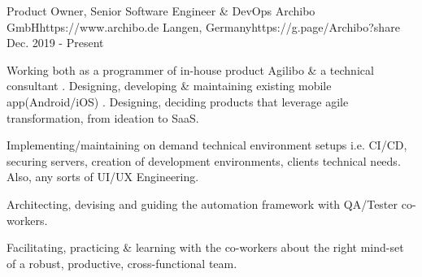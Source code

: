 

\begin{workentries}

\workentry
{Product Owner, Senior Software Engineer \& DevOps} %
{Archibo GmbH}{https://www.archibo.de} %
{Langen, Germany}{https://g.page/Archibo?share} %
{Dec. 2019 - Present} %
    {
      \begin{workitems} %
        \item {Working both as a programmer of in-house product Agilibo \& a technical consultant
        . Designing, developing \& maintaining existing mobile app(Android/iOS)
        . Designing, deciding products that leverage agile transformation, from ideation to SaaS.}
        \item {Implementing/maintaining on demand technical environment setups i.e. CI/CD, securing servers, creation of development environments,
        clients technical needs. Also, any sorts of UI/UX Engineering.}
        \item {Architecting, devising and guiding the automation framework with QA/Tester co-workers.}
        \item {Facilitating, practicing \& learning with the co-workers about the right mind-set of a robust, productive, cross-functional team.}
      \end{workitems}
    }


\end{workentries}

